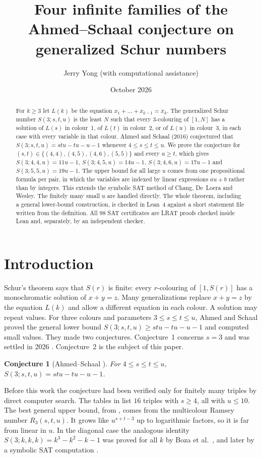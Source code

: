 \documentclass[11pt]{amsart}
\title[Ahmed--Schaal families]{Four infinite families of the
Ahmed--Schaal conjecture on generalized Schur numbers}
\author{Jerry Yong (with computational assistance)}
\date{October 2026}
\newtheorem{conjecture}[theorem]{Conjecture}
\theoremstyle{definition}
\begin{document}
\begin{abstract}
For $k\ge 3$ let $L(k)$ be the equation $x_1+\dots+x_{k-1}=x_k$. The
generalized Schur number $S(3;s,t,u)$ is the least $N$ such that
every $3$-colouring of $[1,N]$ has a solution of $L(s)$ in colour~1,
of $L(t)$ in colour~2, or of $L(u)$ in colour~3, in each case with
every variable in that colour. Ahmed and Schaal (2016) conjectured
that $S(3;s,t,u)=stu-tu-u-1$ whenever $4\le s\le t\le u$. We prove
the conjecture for $(s,t)\in\{(4,4),(4,5),(4,6),(5,5)\}$ and every
$u\ge t$, which gives $S(3;4,4,u)=11u-1$, $S(3;4,5,u)=14u-1$,
$S(3;4,6,u)=17u-1$ and $S(3;5,5,u)=19u-1$. The upper bound for all
large $u$ comes from one propositional formula per pair, in which the
variables are indexed by linear expressions $au+b$ rather than by
integers. This extends the symbolic SAT method of Chang, De~Loera and
Wesley. The finitely many small $u$ are handled directly. The whole
theorem, including a general lower-bound construction, is checked in
Lean~4 against a short statement file written from the definition.
All $98$ SAT certificates are LRAT proofs checked inside Lean and,
separately, by an independent checker.
\end{abstract}

\maketitle

\section{Introduction}

Schur's theorem says that $S(r)$ is finite: every $r$-colouring of
$[1,S(r)]$ has a monochromatic solution of $x+y=z$. Many
generalizations replace $x+y=z$ by the equation $L(k)$ and allow a
different equation in each colour. A solution may repeat values. For
three colours and parameters $3\le s\le t\le u$, Ahmed and Schaal
\cite{AS16} proved the general lower bound $S(3;s,t,u)\ge stu-tu-u-1$
and computed small values. They made two conjectures. Conjecture~1
concerns $s=3$ and was settled in 2026 \cite{CDW26}. Conjecture~2 is
the subject of this paper.

\begin{conjecture}[Ahmed--Schaal \cite{AS16}]
For $4\le s\le t\le u$, $S(3;s,t,u)=stu-tu-u-1$.
\end{conjecture}

Before this work the conjecture had been verified only for finitely
many triples by direct computer search. The tables in
\cite{AS16,CDW26} list $16$ triples with $s\ge4$, all with $u\le10$.
The best general upper bound, from \cite{CDW26}, comes from the
multicolour Ramsey number $R_3(s,t,u)$. It grows like $u^{s+t-3}$ up
to logarithmic factors, so it is far from linear in $u$. In the
diagonal case the analogous identity $S(3;k,k,k)=k^3-k^2-k-1$ was
proved for all $k$ by Boza et al.\ \cite{Boza}, and later by a
symbolic SAT computation \cite{CDLW}.
\end{document}
